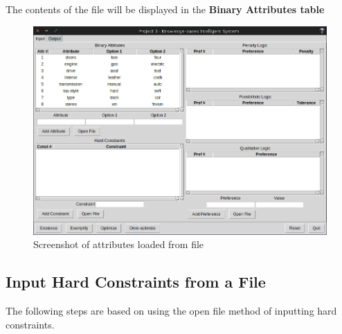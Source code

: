 \documentclass[12pt]{report}
\begin{document}
\begin{description}[leftmargin=4em]
\begin{figure}[H]
\end{figure}
\vspace{-2.5em}
\item [Result:] The contents of the file will be displayed in the \textbf{Binary Attributes table}
\begin{figure}[H]
\begin{center}
\includegraphics[scale=0.3,trim=1cm 1cm 1cm 1cm]{attributes_imported}
\caption{Screenshot of attributes loaded from file}
\end{center}
\end{figure}
\vspace{-2.5em}
\end{description}


\newpage
\subsection{Input Hard Constraints from a File}
The following steps are based on using the open file method of inputting hard constraints.\\
\end{document}
